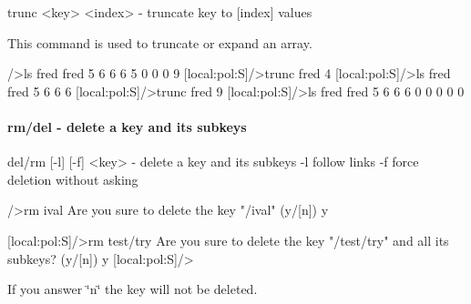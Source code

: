 \begin{DoxyCode}
trunc <key> <index>     - truncate key to [index] values
\end{DoxyCode}


This command is used to truncate or expand an array. 
\begin{DoxyCode}
/>ls fred 
fred
                                5
                                6
                                6
                                6
                                5
                                0
                                0
                                0
                                9
[local:pol:S]/>trunc fred 4
[local:pol:S]/>ls fred
fred
                                5
                                6
                                6
                                6
[local:pol:S]/>trunc fred 9
[local:pol:S]/>ls fred
fred
                                5
                                6
                                6
                                6
                                0
                                0
                                0
                                0
                                0
\end{DoxyCode}


\par
 

\hypertarget{RC_odbedit_examples_RC_odbedit_rm}{}\paragraph{rm/del -\/ delete a key and its subkeys}\label{RC_odbedit_examples_RC_odbedit_rm}

\begin{DoxyCode}
del/rm [-l] [-f] <key>  - delete a key and its subkeys
  -l                      follow links
  -f                      force deletion without asking
\end{DoxyCode}
 \par



\begin{DoxyCode}
/>rm ival
Are you sure to delete the key
"/ival"
(y/[n]) y
 
[local:pol:S]/>rm test/try
Are you sure to delete the key "/test/try"
and all its subkeys? (y/[n]) y
[local:pol:S]/> 
\end{DoxyCode}


If you answer \char`\"{}n\char`\"{} the key will not be deleted.



